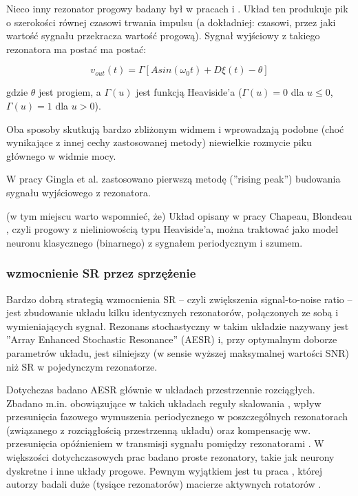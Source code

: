   Nieco inny rezonator progowy badany był w pracach \cite{blondeau_e53} i \cite{blondeau_e55}. Układ ten produkuje pik o szerokości równej czasowi trwania impulsu (a dokładniej: czasowi, przez jaki wartość sygnału przekracza wartość progową). Sygnał wyjściowy z takiego rezonatora ma postać ma postać:

  \begin{equation} \label{sr:gingl2}
    v_{out}(t) = \Gamma[A sin (\omega_0 t) + D \xi(t) - \theta]
  \end{equation}

  gdzie $\theta$ jest progiem, a $\Gamma(u)$ jest funkcją Heaviside'a ($\Gamma(u) = 0$ dla $u \leq 0$, $\Gamma(u) = 1$ dla $u > 0$).

  Oba sposoby skutkują bardzo zbliżonym widmem i wprowadzają podobne (choć wynikające z innej cechy zastosowanej metody) niewielkie rozmycie piku głównego w widmie mocy.

  W pracy Gingla et al. zastosowano pierwszą metodę (''rising peak'') budowania sygnału wyjściowego z rezonatora.

  (w tym miejscu warto wspomnieć, że) Układ opisany w pracy Chapeau, Blondeau \cite{blondeau_e53}, czyli progowy z nieliniowością typu Heaviside'a, można traktować jako model neuronu klasycznego (binarnego) z sygnałem periodycznym i szumem.

  \subsubsection{wzmocnienie SR przez sprzężenie}
  \label{sec:wzmocnienie_przez_sprzezenie}

  Bardzo dobrą strategią wzmocnienia SR -- czyli zwiększenia signal-to-noise ratio -- jest zbudowanie układu kilku identycznych rezonatorów, połączonych ze sobą i wymieniających sygnał. Rezonans stochastyczny w takim układzie nazywany jest ''Array Enhanced Stochastic Resonance'' (AESR) \cite{lindner_meadows} i, przy optymalnym doborze parametrów układu, jest silniejszy (w sensie wyższej maksymalnej wartości SNR) niż SR w pojedynczym rezonatorze.

  Dotychczas badano AESR głównie w układach przestrzennie rozciągłych. Zbadano m.in. obowiązujące w takich układach reguły skalowania \cite{lindner_meadows} \cite{tanabe_shimokawa}, wpływ przesunięcia fazowego wymuszenia periodycznego w poszczególnych rezonatorach (związanego z rozciągłością przestrzenną układu) \cite{ijmpb_14_8} oraz kompensację ww. przesunięcia opóźnieniem w transmisji sygnału pomiędzy rezonatorami \cite{ijmpb_23_2}. W większości dotychczasowych prac badano proste rezonatory, takie jak neurony dyskretne i inne układy progowe. Pewnym wyjątkiem jest tu praca \cite{tanabe_shimokawa}, której autorzy badali duże (tysiące rezonatorów) macierze aktywnych rotatorów \cite{wiesenfeld} \cite{pakdaman}.

